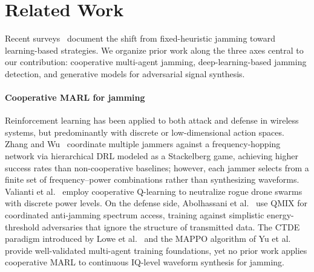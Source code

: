 %

\section{Related Work}

Recent surveys~\cite{jamming_survey_2024} document the shift from fixed-heuristic
jamming toward learning-based strategies. We organize prior work along the three
axes central to our contribution: cooperative multi-agent jamming,
deep-learning-based jamming detection, and generative models for adversarial
signal synthesis.

\paragraph{Cooperative MARL for jamming}
Reinforcement learning has been applied to both attack and defense in wireless
systems, but predominantly with discrete or low-dimensional action spaces.
Zhang and Wu~\cite{article} coordinate multiple jammers against a
frequency-hopping network via hierarchical DRL modeled as a Stackelberg game,
achieving higher success rates than non-cooperative baselines; however, each
jammer selects from a finite set of frequency--power combinations rather than
synthesizing waveforms.
Valianti et al.~\cite{valianti2024cooperative} employ cooperative Q-learning to
neutralize rogue drone swarms with discrete power levels.
On the defense side, Abolhassani et al.~\cite{abolhassani2025coordinated} use
QMIX for coordinated anti-jamming spectrum access, training against simplistic
energy-threshold adversaries that ignore the structure of transmitted data.
The CTDE paradigm introduced by Lowe et al.~\cite{NIPS2017_68a97503} and the
MAPPO algorithm of Yu et al.~\cite{yu2022mappo} provide well-validated
multi-agent training foundations, yet no prior work applies cooperative MARL to
continuous IQ-level waveform synthesis for jamming.

